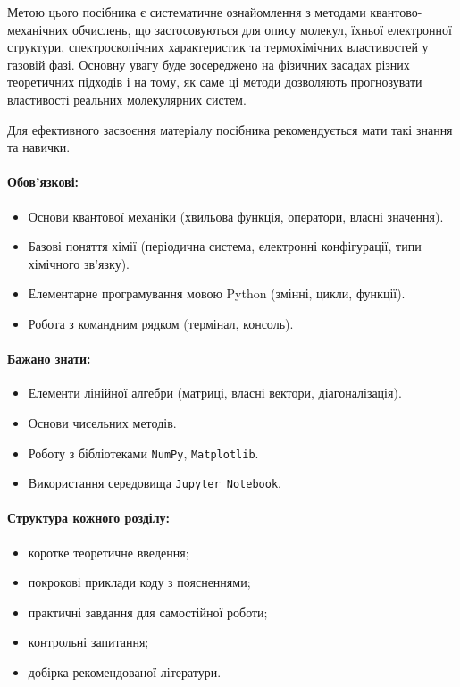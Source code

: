 Метою цього посібника є систематичне ознайомлення з методами квантово-механічних обчислень, що застосовуються для опису молекул, їхньої електронної структури, спектроскопічних характеристик та термохімічних властивостей у газовій фазі. Основну увагу буде зосереджено на фізичних засадах різних теоретичних підходів і на тому, як саме ці методи дозволяють прогнозувати властивості реальних молекулярних систем.




Для ефективного засвоєння матеріалу посібника рекомендується мати такі знання та навички.

\paragraph{Обов’язкові:}
\begin{itemize}
    \item Основи квантової механіки (хвильова функція, оператори, власні значення).
    \item Базові поняття хімії (періодична система, електронні конфігурації, типи хімічного зв’язку).
    \item Елементарне програмування мовою Python (змінні, цикли, функції).
    \item Робота з командним рядком (термінал, консоль).
\end{itemize}

\paragraph{Бажано знати:}
\begin{itemize}
    \item Елементи лінійної алгебри (матриці, власні вектори, діагоналізація).
    \item Основи чисельних методів.
    \item Роботу з бібліотеками \texttt{NumPy}, \texttt{Matplotlib}.
    \item Використання середовища \texttt{Jupyter Notebook}.
\end{itemize}

\paragraph{Структура кожного розділу:}
\begin{itemize}
    \item коротке теоретичне введення;
    \item покрокові приклади коду з поясненнями;
    \item практичні завдання для самостійної роботи;
    \item контрольні запитання;
    \item добірка рекомендованої літератури.
\end{itemize}

